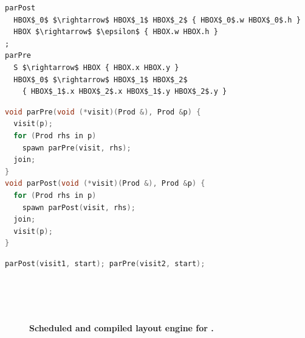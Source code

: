 \newsavebox{\hboxdecomp}
\begin{lrbox}{\hboxdecomp}%
\begin{minipage}{1\columnwidth}
\begin{lstlisting}[mathescape,morekeywords={parPre,parPost}]
parPost
  HBOX$_0$ $\rightarrow$ HBOX$_1$ HBOX$_2$ { HBOX$_0$.w HBOX$_0$.h }
  HBOX $\rightarrow$ $\epsilon$ { HBOX.w HBOX.h }
;
parPre
  S $\rightarrow$ HBOX { HBOX.x HBOX.y }
  HBOX$_0$ $\rightarrow$ HBOX$_1$ HBOX$_2$ 
    { HBOX$_1$.x HBOX$_2$.x HBOX$_1$.y HBOX$_2$.y }
\end{lstlisting}
\end{minipage}
\end{lrbox}

\newsavebox{\traversals}
\begin{lrbox}{\traversals}%
\begin{minipage}{1\columnwidth}
\begin{lstlisting}[mathescape,language=C++,morekeywords={spawn,join}]
void parPre(void (*visit)(Prod &), Prod &p) {
  visit(p);
  for (Prod rhs in p) 
    spawn parPre(visit, rhs);
  join;
}
void parPost(void (*visit)(Prod &), Prod &p) {
  for (Prod rhs in p) 
    spawn parPost(visit, rhs);
  join;
  visit(p);
}
\end{lstlisting}
\end{minipage}
\end{lrbox}

\newsavebox{\hboxparvisitors}
\begin{lrbox}{\hboxparvisitors}%
\begin{minipage}{1\columnwidth}
\begin{lstlisting}[mathescape,language=C++]
parPost(visit1, start); parPre(visit2, start);
\end{lstlisting}
\end{minipage}
\end{lrbox}


\begin{figure}
 \\
 \\
 \\
\caption{\textbf{Scheduled and compiled layout engine for \hlang{}.}}
\label{fig:hboxparallel}
\end{figure}




